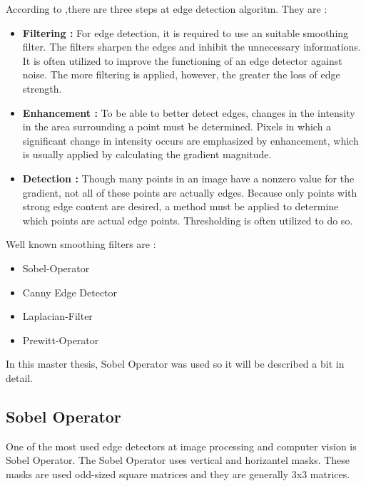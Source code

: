 According to \cite{Machine_Vision},there are three steps at edge detection algoritm. They are :
\begin{itemize}
 \item \textbf{Filtering : } For edge detection, it is required to use an suitable smoothing filter. The filters 
 sharpen the edges and inhibit the unnecessary informations. It is often utilized to improve the functioning of 
 an edge detector against noise. The more filtering is applied, however, the greater the loss of edge strength.
 
 \item \textbf{Enhancement : } To be able to better detect edges, changes in the intensity in the area 
 surrounding a point must be determined. Pixels in which a significant change in intensity occurs are 
 emphasized by enhancement, which is usually applied by calculating the gradient magnitude.
  
 \item \textbf{Detection : } Though many points in an image have a nonzero value for the gradient, not all of 
 these points are actually edges. Because only points with strong edge content are desired, a method must be 
 applied to determine which points are actual edge points. Thresholding is often utilized to do so.
 
\end{itemize}



Well known smoothing filters are :

\begin{itemize}
 \item Sobel-Operator
 \item Canny Edge Detector
 \item Laplacian-Filter
 \item Prewitt-Operator
 \end{itemize}
 
 In this master thesis, Sobel Operator was used so it will be described a bit in detail.
%
\subsection{Sobel Operator}\label{sec:Sobel Operator}

One of the most used edge detectors at image processing and computer vision is Sobel Operator. The Sobel Operator uses vertical and horizantel masks. These masks are used odd-sized square matrices and they are generally 3x3 matrices.


